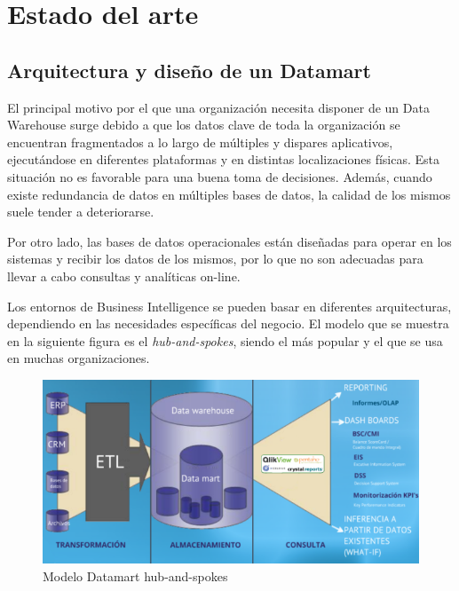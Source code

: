 \documentclass[a4paper, 12pt]{book}
\begin{document}




\cleardoublepage
\chapter{Estado del arte}

\section{Arquitectura y diseño de un Datamart} 
\label{sec:datamart}
El principal motivo por el que una organización necesita disponer de un Data Warehouse surge debido a que los datos clave de toda la organización se encuentran fragmentados a lo largo de múltiples y dispares aplicativos, ejecutándose en diferentes plataformas y en distintas localizaciones físicas. Esta situación no es favorable para una buena toma de decisiones. Además, cuando existe redundancia de datos en múltiples bases de datos, la calidad de los mismos suele tender a deteriorarse.

Por otro lado, las bases de datos operacionales están diseñadas para operar en los sistemas y recibir los datos de los mismos, por lo que no son adecuadas para llevar a cabo consultas y analíticas on-line.

Los entornos de Business Intelligence se pueden basar en diferentes arquitecturas, dependiendo en las necesidades específicas del negocio. El modelo que se muestra en la siguiente figura es el \textit{hub-and-spokes}, siendo el más popular y el que se usa en muchas organizaciones.

\begin{figure}
   \centering
   \includegraphics[width=14cm, keepaspectratio]{img/modelo_Datamart}
   \caption{Modelo Datamart hub-and-spokes}
   \label{fig:modelo_Datamart}
\end{figure}
\end{document}
